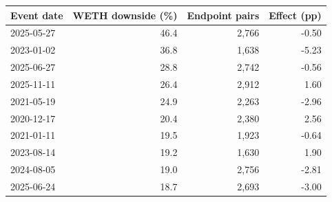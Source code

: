 \begin{tabular}{lrrr}
\toprule
Event date & WETH downside (\%) & Endpoint pairs & Effect (pp) \\
\midrule
2025-05-27 & 46.4 & 2,766 & -0.50 \\
2023-01-02 & 36.8 & 1,638 & -5.23 \\
2025-06-27 & 28.8 & 2,742 & -0.56 \\
2025-11-11 & 26.4 & 2,912 & 1.60 \\
2021-05-19 & 24.9 & 2,263 & -2.96 \\
2020-12-17 & 20.4 & 2,380 & 2.56 \\
2021-01-11 & 19.5 & 1,923 & -0.64 \\
2023-08-14 & 19.2 & 1,630 & 1.90 \\
2024-08-05 & 19.0 & 2,756 & -2.81 \\
2025-06-24 & 18.7 & 2,693 & -3.00 \\
\bottomrule
\end{tabular}
